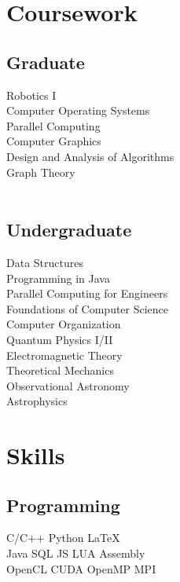 \documentclass[letterpaper]{deedy-resume} %
\begin{document}
\begin{minipage}[t]{0.33\textwidth}
\section{Coursework}

\subsection{Graduate}
Robotics I\\
Computer Operating Systems\\
Parallel Computing\\
Computer Graphics\\
Design and Analysis of Algorithms\\
Graph Theory\\~\\
\subsection{Undergraduate}
Data Structures\\
Programming in Java\\
Parallel Computing for Engineers\\
Foundations of Computer Science\\
Computer Organization\\
Quantum Physics I/II\\
Electromagnetic Theory\\
Theoretical Mechanics\\
Observational Astronomy\\
Astrophysics


\section{Skills}

\subsection{Programming}

C/C++ \textbullet{} Python \textbullet{} \LaTeX\ \\ 
Java \textbullet{} SQL \textbullet{} JS \textbullet{} LUA \textbullet{} Assembly \\
OpenCL \textbullet{} CUDA \textbullet{} OpenMP \textbullet{} MPI
\vspace{5pt}\\

\end{minipage}
\end{document}
